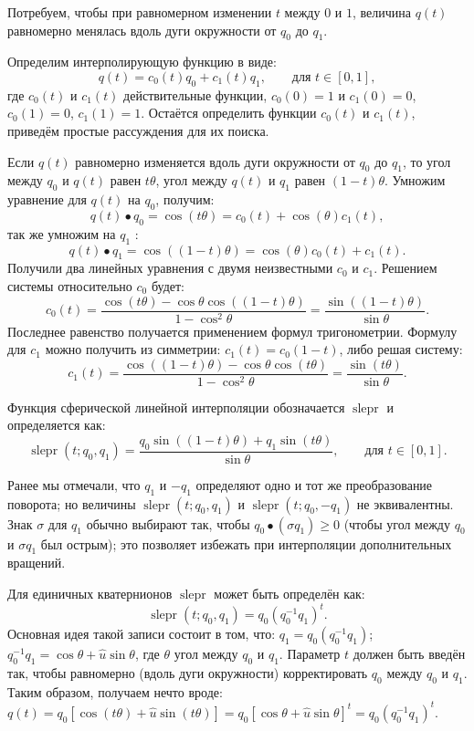 \documentclass[draft]{article}
\DeclareMathOperator{\slerp}{slepr}
\begin{document}
Потребуем, чтобы при равномерном изменении $t$ между $0$ и $1$, величина $q(t)$ равномерно менялась вдоль дуги окружности от $q_0$ до $q_1$.

Определим интерполирующую функцию в виде:
\[q(t) = c_0(t) q_0 + c_1 (t)q_1, \qquad \text{для $t \in [0, 1]$} ,\]
где $c_0(t)$ и $c_1(t)$ действительные функции, $c_0(0) = 1$ и $c_1(0) = 0$, $c_0(1) = 0$, $c_1(1) = 1$. Остаётся определить функции $c_0(t)$ и $c_1(t)$, приведём простые рассуждения для их поиска.

Если $q(t)$ равномерно изменяется вдоль дуги окружности от $q_0$ до $q_1$, то угол между $q_0$ и $q(t)$ равен $t \theta$, угол между $q(t)$ и $q_1$ равен $(1 - t) \theta$.
Умножим уравнение для $q(t)$ на $q_0$, получим:
\[q(t) \bullet q_0 = \cos(t \theta) = c_0(t) + \cos(\theta) c_1(t) ,\]
так же умножим на $q_1$ :
\[q(t) \bullet q_1 = \cos((1 - t) \theta) = \cos(\theta) c_0(t) + c_1(t) .\]
Получили два линейных уравнения с двумя неизвестными $c_0$ и $c_1$. Решением системы относительно $c_0$ будет:
\[c_0(t) = \frac{\cos(t \theta) - \cos\theta \cos((1 - t) \theta)}{1 - \cos^2\theta} = \frac{\sin((1 - t) \theta)}{\sin\theta} .\]
Последнее равенство получается применением формул тригонометрии. Формулу для $c_1$ можно получить из симметрии: $c_1(t) = c_0(1 - t)$, либо решая систему:
\[c_1(t) = \frac{\cos((1 - t) \theta) - \cos\theta \cos(t \theta)}{1 - \cos^2\theta} = \frac{\sin(t \theta)}{\sin\theta} .\]

Функция сферической линейной интерполяции обозначается $\slerp$ и определяется
как:
\begin{equation}
\label{eq:17}
\slerp(t; q_0, q_1) = \frac{q_0 \sin((1-t) \theta) + q_1 \sin(t \theta)}{\sin\theta} , \qquad \text{для $t \in [0, 1] $} .
\end{equation}

Ранее мы отмечали, что $q_1$ и $-q_1$ определяют одно и тот же преобразование поворота; но величины $\slerp(t; q_0, q_1)$ и $\slerp(t; q_0, -q_1)$ не эквивалентны. Знак $\sigma$ для $q_1$ обычно выбирают так, чтобы $q_0 \bullet (\sigma q_1) \geq 0$ (чтобы угол между $q_0$ и $\sigma q_1$ был острым); это позволяет избежать при интерполяции дополнительных вращений.

Для единичных кватернионов $\slerp$ может быть определён как:
\begin{equation}
\label{eq:18}
\slerp(t; q_0, q_1) = q_0 (q_0^{-1} q_1)^t .
\end{equation}
Основная идея такой записи состоит в том, что: $q_1 = q_0 (q_0^{-1} q_1)$; $q_0^{-1} q_1 = \cos\theta + \widehat{u} \sin\theta$, где $\theta$ угол между $q_0$ и $q_1$. Параметр %
$t$ должен быть введён так, чтобы равномерно (вдоль дуги окружности) корректировать $q_0$ между $q_0$ и $q_1$. Таким образом, получаем нечто вроде: $q(t) = q_0 [\cos(t \theta) + \widehat{u} \sin(t \theta)] = q_0 [\cos\theta + \widehat{u} \sin\theta]^t = q_0(q_0^{-1}q_1)^t$.
\end{document}
